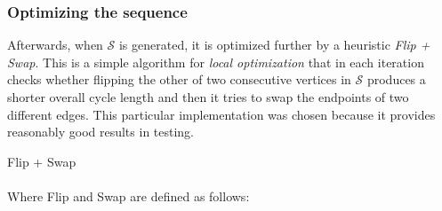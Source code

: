 \documentclass{article}
\begin{document}
\subsubsection{Optimizing the sequence}

Afterwards, when $\mathcal{S}$ is generated, it is optimized further by a heuristic \textit{Flip + Swap}. This is a simple algorithm for \textit{local optimization} that in each iteration checks whether flipping the other of two consecutive vertices in $\mathcal{S}$ produces a shorter overall cycle length and then it tries to swap the endpoints of two different edges. This particular implementation was chosen because it provides reasonably good results in testing.

\begin{algorithm}[H]
  \label{alg:flip-swap}
  \caption{Flip + Swap}

\end{algorithm}

\paragraph{}
Where Flip and Swap are defined as follows:
\end{document}
